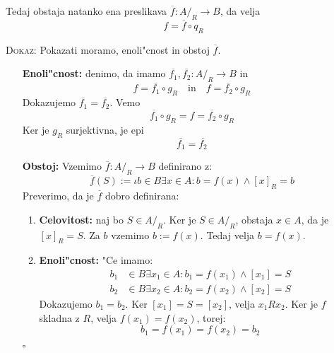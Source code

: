 Tedaj obstaja natanko ena preslikava $\overline{f}: A/_R \to B$, da velja
\begin{equation*}
f = \overline{f} \circ q_R
\end{equation*}
\begin{figure}[!htbp]
	\centering
\end{figure}
\textsc{Dokaz:} Pokazati moramo, enoli"cnost in obstoj $\overline{f}$.
\begin{itemize}
	\item[\textbf{Enoli"cnost:}] denimo, da imamo $\overline{f_1}, \overline{f_2}: A/_R \to B$ in
	\begin{equation*}
	f = \overline{f_1} \circ g_R \quad \text{in} \quad f = \overline{f_2} \circ g_R
	\end{equation*}
	Dokazujemo $\overline{f_1} = \overline{f_2}$. Vemo 
	\begin{equation*}
	\overline{f_1} \circ g_R = f = \overline{f_2} \circ g_R
	\end{equation*}
	Ker je $g_R$ surjektivna, je epi
	\begin{equation*}
	\overline{f_1} = \overline{f_2}
	\end{equation*}
	
	\item[\textbf{Obstoj:}] Vzemimo $\overline{f}: A/_R \to B$ definirano z:
	\begin{equation*}
	\overline{f}(S) := \iota b \in B \exists x \in A: b = f(x) \land [x]_R = b
	\end{equation*}
	Preverimo, da je $\overline{f}$ dobro definirana:
	\begin{enumerate}
		\item \textbf{Celovitost:} naj bo $S \in A/_R$. Ker je $S \in A/_R$, obstaja $x \in A$, da je $[x]_R = S$. Za $b$ vzemimo $b := f(x)$. Tedaj velja $b = f(x)$.
		
		\item \textbf{Enoli"cnost:} "Ce imamo:
		\begin{align*}
		b_1 &\in B \exists x_1 \in A: b_1 = f(x_1) \land [x_1] = S \\
		b_2 &\in B \exists x_2 \in A: b_2 = f(x_2) \land [x_2] = S
		\end{align*}
		Dokazujemo $b_1 = b_2$. Ker $[x_1] = S = [x_2]$, velja $x_1 R x_2$. Ker je $f$ skladna z $R$, velja $f(x_1) = f(x_2)$, torej:
		\begin{equation*}
		b_1 = f(x_1) = f(x_2) = b_2
		\end{equation*}
	\end{enumerate}
	\hfill $\square$
\end{itemize}
%
